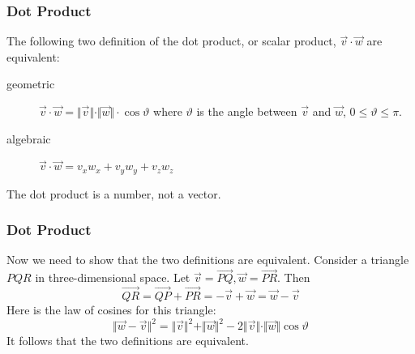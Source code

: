 \documentclass[xcolor=dvipsnames]{beamer}
\begin{document}

\begin{frame}
  \frametitle{Dot Product}
  The following two definition of the \alert{dot product}, or
  \alert{scalar product}, $\vec{v}\cdot\vec{w}$ are equivalent:
  \begin{description}
  \item[geometric]
    $\vec{v}\cdot\vec{w}=\Vert\vec{v}\Vert\cdot\Vert\vec{w}\Vert\cdot\cos\vartheta$
    where $\vartheta$ is the angle between $\vec{v}$ and $\vec{w}$,
    $0\leq\vartheta\leq\pi$.
  \item[algebraic] $\vec{v}\cdot\vec{w}=v_{x}w_{x}+v_{y}w_{y}+v_{z}w_{z}$
  \end{description}
The dot product is a number, not a vector.
\end{frame}

\begin{frame}
  \frametitle{Dot Product}
  Now we need to show that the two definitions are equivalent.
  Consider a triangle $PQR$ in three-dimensional space. Let
  $\vec{v}=\vec{PQ},\vec{w}=\vec{PR}$. Then
  \begin{equation}
    \label{eq:oobeipho}
  \vec{QR}=\vec{QP}+\vec{PR}=-\vec{v}+\vec{w}=\vec{w}-\vec{v}  
\end{equation}
Here is the law of cosines for this triangle:
\begin{equation}
  \label{eq:aiwahzoa}
  \Vert\vec{w}-\vec{v}\Vert^{2}=\Vert\vec{v}\Vert^{2}+\Vert\vec{w}\Vert^{2}-2\Vert\vec{v}\Vert\cdot\Vert\vec{w}\Vert\cos\vartheta
\end{equation}
It follows that the two definitions are equivalent.
\end{frame}
\end{document}
